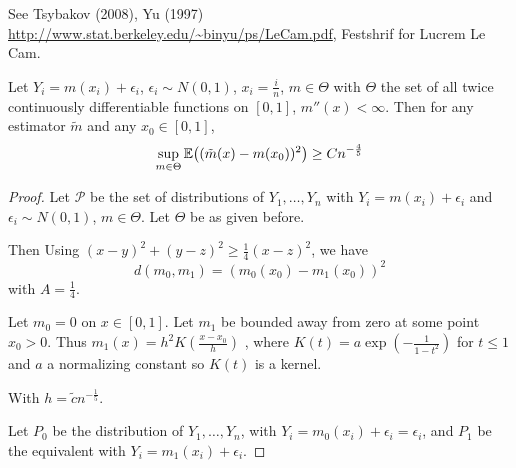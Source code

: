 See Tsybakov (2008), Yu (1997)
\url{http://www.stat.berkeley.edu/~binyu/ps/LeCam.pdf}, Festshrif for
Lucrem Le Cam.


\begin{thm}
  \label{defn:minimax_lower_bounds:1}
  Let $Y_{i} = m(x_{i}) + \epsilon_{i}$, $\epsilon_{i} \sim N(0, 1)$,
  $x_{i} = \frac{i}{n}$, $m \in \Theta$ with $\Theta$ the set of all
  twice continuously differentiable functions on $[0, 1]$, $m''(x) <
  \infty$.
  Then for any estimator $\tilde m$ and any $x_{0} \in [0, 1]$,
  \begin{equation}
    \label{eq:115}
    \sup_{m \in \Theta} \E{(\tilde m(x) - m(x_{0}))^{2}} \geq C n^{-\frac{4}{5}}
  \end{equation}
\end{thm}

\begin{proof}
  Let $\mathcal{P}$ be the set of distributions of $Y_{1}, \dots,
  Y_{n}$ with $Y_{i} = m(x_{i}) + \epsilon_{i}$ and $\epsilon_{i} \sim
  N(0, 1)$, $m \in \Theta$. Let $\Theta$ be as given before.

  Then Using $(x - y)^{2} + (y - z)^{2} \geq \frac{1}{4} (x - z)^{2}$,
  we have
  \begin{equation}
    \label{eq:116}
    d(m_{0}, m_{1}) =  (m_{0}(x_{0}) - m_{1}(x_{0}))^{2}
  \end{equation} with $A = \frac{1}{4}$.

  Let $m_{0} = 0$ on $x \in [0, 1]$.  Let $m_{1}$ be bounded away from
  zero at some point $x_{0} > 0$.  Thus $m_{1}(x) = h^{2} K(\frac{x -
    x_{0}}{h})$ , where $K(t) = a \exp(- \frac{1}{1 - t^{2}})$ for $t
  \leq 1$ and $a$ a normalizing constant so $K(t)$ is a kernel.

  With $h = \tilde c n^{-\frac{1}{5}}$.

  Let $P_{0}$ be the distribution of $Y_{1}, \dots, Y_{n}$, with
  $Y_{i} = m_{0}(x_{i}) + \epsilon_{i} = \epsilon_{i}$, and $P_{1}$ be
  the equivalent with $Y_{i} = m_{1}(x_{i}) + \epsilon_{i}$.


\end{proof}
